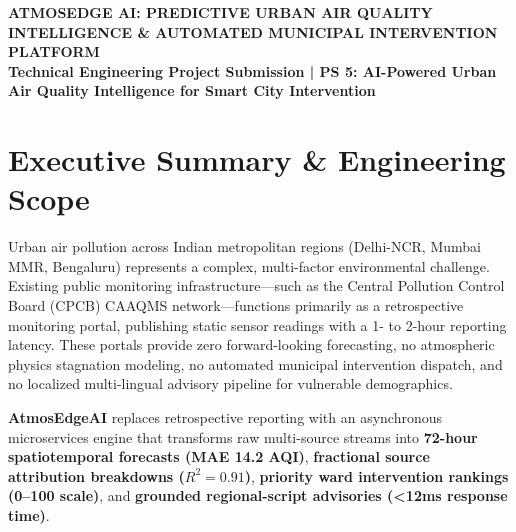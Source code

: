 \documentclass[11pt, a4paper]{article}
\newcommand{\atmosedge}{\textbf{\textcolor{mainblue}{AtmosEdgeAI}}}
\begin{document}
\thispagestyle{empty}

\begin{center}
  \vspace*{-6pt}
  {\Large\color{mainblue}\textbf{ATMOSEDGE AI: PREDICTIVE URBAN AIR QUALITY INTELLIGENCE \& AUTOMATED MUNICIPAL INTERVENTION PLATFORM}}\\[4pt]
  {\large\color{boiorange}\textbf{Technical Engineering Project Submission | PS 5: AI-Powered Urban Air Quality Intelligence for Smart City Intervention}}\\[6pt]
  
\end{center}

\vspace{2pt}

\section{Executive Summary \& Engineering Scope}
Urban air pollution across Indian metropolitan regions (Delhi-NCR, Mumbai MMR, Bengaluru) represents a complex, multi-factor environmental challenge. Existing public monitoring infrastructure—such as the Central Pollution Control Board (CPCB) CAAQMS network—functions primarily as a retrospective monitoring portal, publishing static sensor readings with a 1- to 2-hour reporting latency. These portals provide zero forward-looking forecasting, no atmospheric physics stagnation modeling, no automated municipal intervention dispatch, and no localized multi-lingual advisory pipeline for vulnerable demographics.

\atmosedge{} replaces retrospective reporting with an asynchronous microservices engine that transforms raw multi-source streams into \textbf{72-hour spatiotemporal forecasts (MAE 14.2 AQI)}, \textbf{fractional source attribution breakdowns ($R^2 = 0.91$)}, \textbf{priority ward intervention rankings (0--100 scale)}, and \textbf{grounded regional-script advisories (<12ms response time)}.
\end{document}
